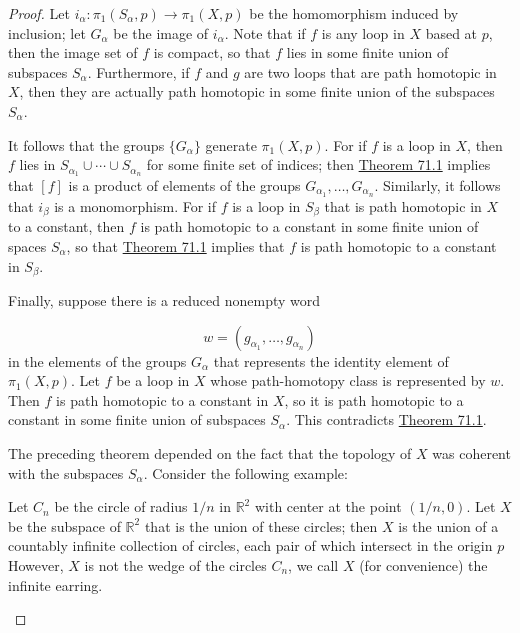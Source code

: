\begin{proof}
Let \(i_{\alpha } : {\pi }_{1}( {S_{\alpha },p}) \rightarrow {\pi }_{1}( {X,p})\) be the homomorphism induced by inclusion; let \(G_{\alpha }\) be the image of \(i_{\alpha }\).
Note that if \(f\) is any loop in \(X\) based at \(p\), then the image set of \(f\) is compact, so that \(f\) lies in some finite union of subspaces \(S_{\alpha }\). Furthermore, if \(f\) and \(g\) are two loops that are path homotopic in \(X\), then they are actually path homotopic in some finite union of the subspaces \(S_{\alpha }\).

It follows that the groups \(\{ G_{\alpha }\}\) generate \({\pi }_{1}( {X,p})\). For if \(f\) is a loop in \(X\), then \(f\) lies in \(S_{{\alpha }_{1}} \cup \cdots \cup {S}_{{\alpha }_{n}}\) for some finite set of indices; then \hyperref[thm:71.1]{Theorem 71.1} implies that \([ f]\) is a product of elements of the groups \(G_{{\alpha }_{1}},\ldots ,G_{{\alpha }_{n}}\). Similarly, it follows that \(i_{\beta }\) is a monomorphism. For if \(f\) is a loop in \(S_{\beta }\) that is path homotopic in \(X\) to a constant, then \(f\) is path homotopic to a constant in some finite union of spaces \(S_{\alpha }\), so that \hyperref[thm:71.1]{Theorem 71.1} implies that \(f\) is path homotopic to a constant in \(S_{\beta }\).

Finally, suppose there is a reduced nonempty word

\[
w = ( {g_{{\alpha }_{1}},\ldots ,g_{{\alpha }_{n}}})
\]
in the elements of the groups \(G_{\alpha }\) that represents the identity element of \({\pi }_{1}( {X,p})\). Let \(f\) be a loop in \(X\) whose path-homotopy class is represented by \(w\). Then \(f\) is path homotopic to a constant in \(X\), so it is path homotopic to a constant in some finite union of subspaces \(S_{\alpha }\). This contradicts \hyperref[thm:71.1]{Theorem 71.1}.

The preceding theorem depended on the fact that the topology of \(X\) was coherent with the subspaces \(S_{\alpha }\). Consider the following example:

\begin{centeredblock}
\begin{example}
\label{ex:\thesection.\theexample}
Let \(C_{n}\) be the circle of radius \(1/n\) in \(\mathbb{R}^{2}\) with center at the point \(( {1/n,0})\). Let \(X\) be the subspace of \(\mathbb{R}^{2}\) that is the union of these circles; then \(X\) is the union of a countably infinite collection of circles, each pair of which intersect in the origin \(p\) However, \(X\) is not the wedge of the circles \(C_{n}\), we call \(X\) (for convenience) the infinite earring.


\end{example}
\end{centeredblock}
\end{proof}
